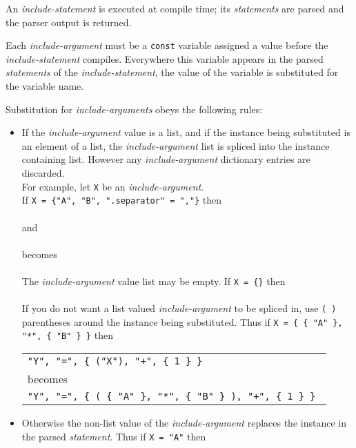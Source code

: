 \documentclass[12pt]{article}
\begin{document}
An {\em include-statement} is executed at compile time;
its {\em statements} are parsed and the parser output is
returned.

Each {\em include-argument} must be a {\tt const} variable assigned
a value before the {\em include-state\-ment} compiles.
Everywhere this variable
appears in the parsed {\em statements} of the {\em include-statement},
the value of the variable is substituted for the variable name.

Substitution for {\em include-arguments} obeys the following rules:
\begin{itemize}
\item \label{INCLUDE-SPLICING} If the {\em include-argument}
value is a list, and if the
instance being substituted is an element of a list,
the {\em include-argument} list is spliced into the instance containing
list.  However any {\em include-argument} dictionary entries are
discarded.
\\[0.5ex]
For example, let {\tt X} be an {\em include-argument}.
\\[0.5ex]
If {\tt X = \{"A", "B", ".separator" = ","\}} then \\
 \\
and \\
 \\
becomes \\
 \\
The {\em include-argument} value list may be empty.
If {\tt X = \{\}} then \\
 \\
If you do not want a list valued {\em include-argument} to be spliced in,
use {\tt (~)} parentheses around the instance being substituted.
Thus if {\tt X = \{ \{ "A" \}, "*",  \{ "B" \} \}} then \\
\hspace*{2em}%
     \begin{tabular}{l}
     \tt "Y", "=", \{ ("X"), "+", \{ 1 \} \} \\
     becomes \\
     \tt "Y", "=", \{ ( \{ "A" \}, "*", \{ "B" \} ), "+", \{ 1 \} \}
     \end{tabular}

\item Otherwise the non-list value of the {\em include-argument} replaces the
instance in the parsed {\em statement}.
Thus if {\tt X = "A"} then \\
\end{itemize}
\end{document}
